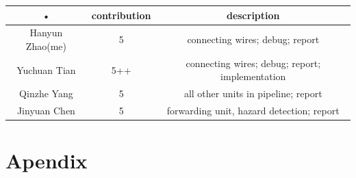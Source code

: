 \documentclass[a4paper,12pt]{article}
\begin{document}
\begin{tabular}{|c|c|c|}

\hline 
• & contribution & description \\ 
\hline 
Hanyun Zhao(me) & 5 & connecting wires; debug; report \\ 
\hline 
Yuchuan Tian & 5++ & connecting wires; debug; report; implementation \\ 
\hline 
Qinzhe Yang & 5 & all other units in pipeline; report \\ 
\hline 
Jinyuan Chen & 5 & forwarding unit, hazard detection; report \\ 
\hline 
\end{tabular} 

\section{Apendix}
\end{document}
